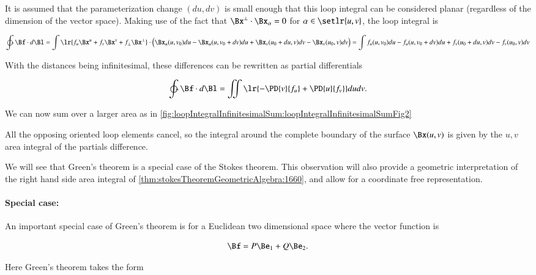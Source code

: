 It is assumed that the parameterization change \((du, dv)\) is small enough that this loop integral can be considered planar (regardless of the dimension of the vector space).
Making use of the fact that \(\Bx^\perp \cdot \Bx_\alpha = 0\) for \(\alpha \in \setlr{u,v}\), the loop integral is

\begin{dmath}\label{eqn:stokesTheoremGeometricAlgebra:1620}
\ointctrclockwise \Bf \cdot d\Bl
=
\int
\lr{
f_u \Bx^u + f_v \Bx^v + f_\perp \Bx^\perp
}
\cdot
\Bigl(
\Bx_u(u, v_0) du - \Bx_u(u, v_0 + dv) du
+\Bx_v(u_0 + du, v) dv - \Bx_v(u_0, v) dv
\Bigr)
=
\int
f_u(u, v_0) du - f_u(u, v_0 + dv) du
+
f_v(u_0 + du, v) dv - f_v(u_0, v) dv
\end{dmath}

With the distances being infinitesimal, these differences can be rewritten as partial differentials

\begin{dmath}\label{eqn:stokesTheoremGeometricAlgebra:1860}
\ointctrclockwise \Bf \cdot d\Bl
=
\iint \lr{
-\PD{v}{f_u}
+\PD{u}{f_v}
}
du dv.
\end{dmath}

We can now sum over a larger area as in \cref{fig:loopIntegralInfinitesimalSum:loopIntegralInfinitesimalSumFig2}


All the opposing oriented loop elements cancel, so the integral around the complete boundary of the surface \(\Bx(u, v)\) is given by the \(u,v\) area integral of the partials difference.

We will see that Green's theorem is a special case of the Stokes theorem.
This observation will also provide a geometric interpretation of the right hand side area integral of \cref{thm:stokesTheoremGeometricAlgebra:1660}, and allow for a coordinate free representation.

\paragraph{Special case:}

An important special case of Green's theorem is for a Euclidean two dimensional space where the vector function is

\begin{dmath}\label{eqn:stokesTheoremGeometricAlgebra:1720}
\Bf = P \Be_1 + Q \Be_2.
\end{dmath}

Here Green's theorem takes the form

